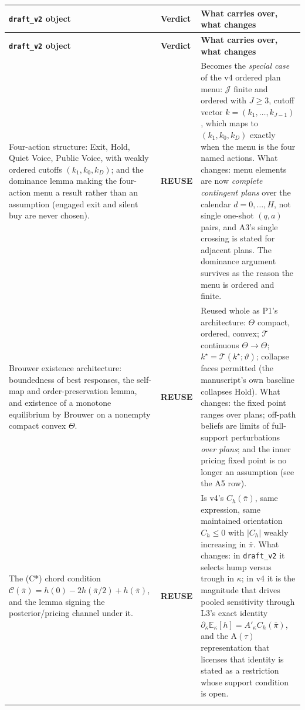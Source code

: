 \documentclass[11pt,a4paper]{article}
\newcommand{\Eop}{\mathbb{E}}
\newcommand{\Tmap}{\mathcal{T}}
\newcommand{\Atau}{\mathrm{A}(\tau)}
\newcommand{\Akap}{A'_{\kappa}}
\begin{document}
\begingroup
\small
\setlength{\extrarowheight}{2pt}
\begin{longtable}{@{}>{\raggedright\arraybackslash}p{}>{\raggedright\arraybackslash}p{}>{\raggedright\arraybackslash}p{}@{}}
\toprule
\textbf{\texttt{draft\_v2} object} & \textbf{Verdict} & \textbf{What carries over, what changes}\\
\midrule
\endfirsthead
\toprule
\textbf{\texttt{draft\_v2} object} & \textbf{Verdict} & \textbf{What carries over, what changes}\\
\midrule
\endhead
\bottomrule
\endfoot

Four-action structure: Exit, Hold, Quiet Voice, Public Voice, with weakly ordered
cutoffs $(k_1,k_0,k_D)$; and the dominance lemma making the four-action menu a
result rather than an assumption (engaged exit and silent buy are never chosen). &
\textbf{REUSE} &
Becomes the \emph{special case} of the v4 ordered plan menu: $\mathcal J$ finite and
ordered with $J\ge3$, cutoff vector $k=(k_1,\dots,k_{J-1})$, which maps to
$(k_1,k_0,k_D)$ exactly when the menu is the four named actions. What changes: menu
elements are now \emph{complete contingent plans} over the calendar
$d=0,\dots,H$, not single one-shot $(q,a)$ pairs, and A3's single crossing is stated
for adjacent plans. The dominance argument survives as the reason the menu is
ordered and finite. \\
\addlinespace

Brouwer existence architecture: boundedness of best responses, the self-map and
order-preservation lemma, and existence of a monotone equilibrium by Brouwer on a
nonempty compact convex $\Theta$. &
\textbf{REUSE} &
Reused whole as P1's architecture: $\Theta$ compact, ordered, convex; $\Tmap$
continuous $\Theta\to\Theta$; $k^\star=\Tmap(k^\star;\vartheta)$; collapse faces
permitted (the manuscript's own baseline collapses Hold). What changes: the fixed
point ranges over plans; off-path beliefs are limits of full-support perturbations
\emph{over plans}; and the inner pricing fixed point is no longer an assumption
(see the A5 row). \\
\addlinespace

The (C*) chord condition
$\mathcal C(\bar\pi)=h(0)-2h(\bar\pi/2)+h(\bar\pi)$, and the lemma signing the
posterior/pricing channel under it. &
\textbf{REUSE} &
Is v4's $C_h(\bar\pi)$, same expression, same maintained orientation
$C_h\le0$ with $|C_h|$ weakly increasing in $\bar\pi$. What changes: in
\texttt{draft\_v2} it selects hump versus trough in $\kappa$; in v4 it is the
magnitude that drives pooled sensitivity through L3's exact identity
$\partial_\kappa\Eop_\kappa[h]=\Akap C_h(\bar\pi)$, and the $\Atau$ representation
that licenses that identity is stated as a restriction whose support condition is
open. \\
\addlinespace


\end{longtable}
\end{document}
